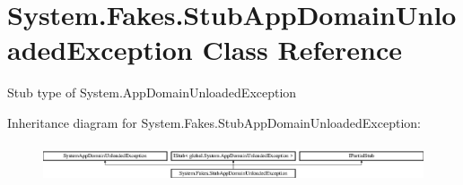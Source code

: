 \hypertarget{class_system_1_1_fakes_1_1_stub_app_domain_unloaded_exception}{\section{System.\-Fakes.\-Stub\-App\-Domain\-Unloaded\-Exception Class Reference}
\label{class_system_1_1_fakes_1_1_stub_app_domain_unloaded_exception}
}


Stub type of System.\-App\-Domain\-Unloaded\-Exception 


Inheritance diagram for System.\-Fakes.\-Stub\-App\-Domain\-Unloaded\-Exception\-:\begin{figure}[H]
\begin{center}
\leavevmode
\includegraphics[height=1.141692cm]{class_system_1_1_fakes_1_1_stub_app_domain_unloaded_exception}
\end{center}
\end{figure}
